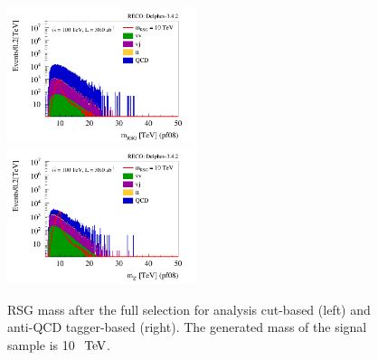 \documentclass{cernrep}
\begin{document}
\begin{figure}[!htb]\centering
\includegraphics[width=0.495\textwidth]{Fig/RSGww/cut/Mj1j2_pf08_sel2_nostack_log.png}
\includegraphics[width=0.495\textwidth]{Fig/RSGww/tagger/Mj1j2_pf08_sel2_nostack_log.png}
\caption{RSG mass after the full selection for analysis cut-based (left) and anti-QCD tagger-based (right). The generated mass of the signal sample is 10 $\TeV$.}
\label{fig:RSGww_mass_sel_final}
\end{figure}
\end{document}
